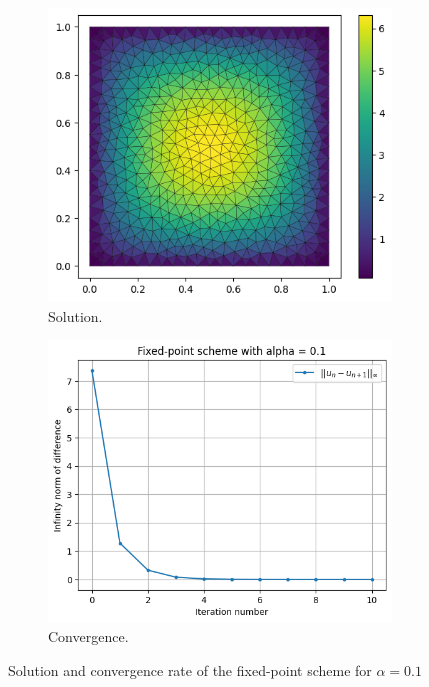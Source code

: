\documentclass[11pt, a4paper, twoside]{article}
\begin{document}
\begin{figure}[H]
\begin{subfigure}[h]{0.5\linewidth}
\includegraphics[scale = 0.6]{../Figures/fixed_sol_alpha0.1.png}
\caption{Solution.}
\label{q2fig1}
\end{subfigure}
\hfill
\begin{subfigure}[h]{0.5\linewidth}
\includegraphics[scale = 0.6]{../Figures/fixed_conv_alpha0.1.png}
\caption{Convergence.}
\label{q2fig2}
\end{subfigure}%
\caption{Solution and convergence rate of the fixed-point scheme for $\alpha=0.1$}
\end{figure}
\end{document}
